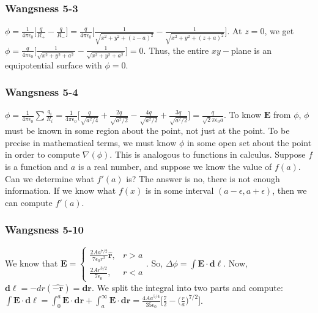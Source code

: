 \documentclass[oneside]{book}
\theoremstyle{definition}
\newcommand*\B[1]{\mathbf{#1}}
\newcommand*\Bh[1]{\mathbf{\hat{#1}}}
\begin{document}
\subsubsection{Wangsness 5-3}

$\phi = \frac{1}{4\pi \epsilon_0}\big[ \frac{q}{R_{+}} - \frac{q}{R_{-}}\big] = \frac{q}{4\pi \epsilon_0}\big[\frac{1}{\sqrt{x^2+y^2+(z-a)^2}}-\frac{1}{\sqrt{x^2+y^2+(z+a)^2}}\big]$. At $z=0$, we get $\phi = \frac{q}{4\pi \epsilon_0}\big[ \frac{1}{\sqrt{x^2+y^2+a^2}}-\frac{1}{\sqrt{x^2+y^2+a^2}}\big] = 0$. Thus, the entire $xy-$plane is an equipotential surface with $\phi = 0$.

\begin{figure}[!h]
  \centering
\end{figure}

\subsubsection{Wangsness 5-4}

$\phi = \frac{1}{4\pi \epsilon_0} \sum \frac{q_i}{R_i} = \frac{1}{4\pi \epsilon_0}\bigg[ \frac{q}{\sqrt{a^2/4}}+\frac{2q}{\sqrt{a^2/2}}-\frac{4q}{\sqrt{a^2/2}}+\frac{3q}{\sqrt{a^2/2}}\bigg] = \frac{q}{\sqrt{2}\pi \epsilon_0 a}$. To know $\B{E}$ from $\phi$, $\phi$ must be known in some region about the point, not just at the point. To be precise in mathematical terms, we must know $\phi$ in some open set about the point in order to compute $\nabla(\phi)$. This is analogous to functions in calculus. Suppose $f$ is a function and $a$ is a real number, and suppose we know the value of $f(a)$. Can we determine what $f'(a)$ is? The answer is no, there is not enough information. If we know what $f(x)$ is in some interval $(a-\epsilon,a+\epsilon)$, then we can compute $f'(a)$.
\begin{figure}[!h]
  \centering
\end{figure}



\subsubsection{Wangsness 5-10}

We know that $\B{E} = \begin{cases} \frac{2A a^{7/2}}{7\epsilon_0 r^2}\Bh{r}, & r>a \\ \frac{2A r^{3/2}}{7\epsilon_0}, & r<a\end{cases}$. So, $\Delta \phi = \int \B{E} \cdot \B{d\ell}$. Now, $\B{d\ell} = -dr(\Bh{-r}) = \B{dr}$. We split the integral into two parts and compute: $\int \B{E}\cdot \B{d\ell} = \int_{0}^{a} \B{E}\cdot \B{dr} + \int_{a}^{\infty} \B{E}\cdot \B{dr} = \frac{4A a^{5/4}}{35 \epsilon_0}\bigg[ \frac{7}{2}-\big(\frac{r}{a}\big)^{7/2}\bigg]$.
\end{document}
